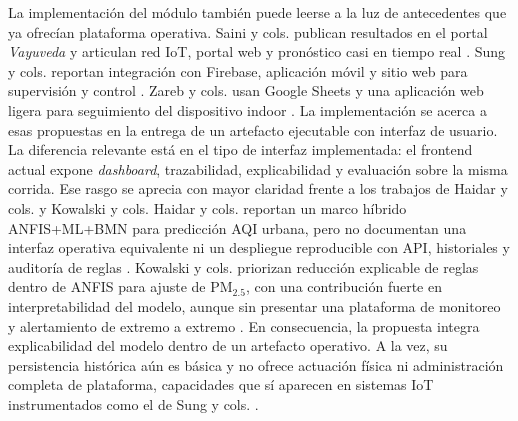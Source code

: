 La implementación del módulo también puede leerse a la luz de antecedentes que ya ofrecían plataforma operativa. Saini y cols. publican resultados en el portal \textit{Vayuveda} y articulan red IoT, portal web y pronóstico casi en tiempo real \cite[pp.~3--4,~9--11]{A135}. Sung y cols. reportan integración con Firebase, aplicación móvil y sitio web para supervisión y control \cite[pp.~1,~11--15]{A114}. Zareb y cols. usan Google Sheets y una aplicación web ligera para seguimiento del dispositivo indoor \cite[pp.~2--3,~5]{A167}. La implementación se acerca a esas propuestas en la entrega de un artefacto ejecutable con interfaz de usuario. La diferencia relevante está en el tipo de interfaz implementada: el frontend actual expone \textit{dashboard}, trazabilidad, explicabilidad y evaluación sobre la misma corrida. Ese rasgo se aprecia con mayor claridad frente a los trabajos de Haidar y cols. y Kowalski y cols. Haidar y cols. reportan un marco híbrido ANFIS+ML+BMN para predicción AQI urbana, pero no documentan una interfaz operativa equivalente ni un despliegue reproducible con API, historiales y auditoría de reglas \cite[pp.~1,~4--5]{A028}. Kowalski y cols. priorizan reducción explicable de reglas dentro de ANFIS para ajuste de PM$_{2.5}$, con una contribución fuerte en interpretabilidad del modelo, aunque sin presentar una plataforma de monitoreo y alertamiento de extremo a extremo \cite[pp.~1--5,~8--10]{A084}. En consecuencia, la propuesta integra explicabilidad del modelo dentro de un artefacto operativo. A la vez, su persistencia histórica aún es básica y no ofrece actuación física ni administración completa de plataforma, capacidades que sí aparecen en sistemas IoT instrumentados como el de Sung y cols. \cite[pp.~11--15]{A114}.

